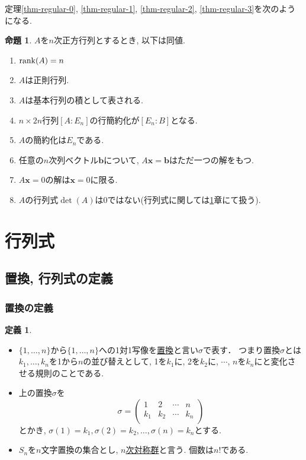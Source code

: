 \documentclass[dvipdfmx,a4paper,11pt]{article} %
\theoremstyle{definition}
\newtheorem{prop}[thm]{命題}
\newtheorem{dfn}[thm]{定義}
\begin{document}
 
定理\ref{thm-regular-0}, \ref{thm-regular-1}, \ref{thm-regular-2}, \ref{thm-regular-3}を次のようになる. 
 \begin{prop}
     $A$を$n$次正方行列とするとき, 以下は同値.
\begin{enumerate}
  \setlength{\parskip}{0cm} 
  \setlength{\itemsep}{0cm}
\item $\rank (A) =n$
\item $A$は正則行列.
\item $A$は基本行列の積として表される. 
\item $n \times 2n$行列$[A : E_n]$の行簡約化が$[E_n : B]$となる. 
\item $A$の簡約化は$E_n$である.
\item 任意の$n$次列ベクトル$\bm{b}$について, $A \bm{x}=\bm{b}$はただ一つの解をもつ.
\item $A \bm{x}=0$の解は$\bm{x}=0$に限る.
\item $A$の行列式$\det(A)$は0ではない(行列式に関しては\ref{sec:det}章にて扱う).
\end{enumerate}
 \end{prop}

 
 \newpage
 
 \section{行列式 \cite[3 章]{O}}
  \label{sec:det}
  
\subsection{置換, 行列式の定義 \cite[3.1節]{O}}

\subsubsection{置換の定義}
 \begin{dfn}

    \begin{itemize}
\item $\{ 1, \ldots, n\}$から$\{ 1, \ldots, n\}$への1対1写像を\underline{置換}と言い$\sigma$で表す．
つまり置換$\sigma$とは$k_1, \ldots, k_n$を1から$n$の並び替えとして, 
1を$k_1$に, 2を$k_2$に, $\cdots$, $n$を$k_n$にと変化させる規則のことである.
\item 上の置換$\sigma$を
$$
\sigma =
  \begin{pmatrix}
 1& 2  &\cdots &n\\
 k_1& k_2  &\cdots &k_n\\
 \end{pmatrix} 
$$
とかき, $\sigma(1) =k_1, \sigma(2) =k_2, \ldots, \sigma(n) =k_n$とする.
\item $S_n$を$n$文字置換の集合とし, \underline{$n$次対称群}と言う. 個数は$n!$である.   
    \end{itemize}
  \end{dfn}
\end{document}
